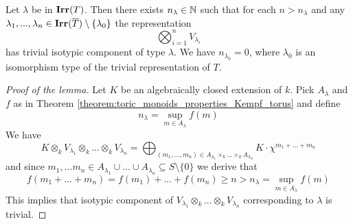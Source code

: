 \begin{lemma}\label{lemma:stablization_for_representations}
Let $\lambda$ be in $\mathbf{Irr}(T)$. Then there exists $n_{\lambda}\in {\mathbb N}$ such that for each $n > n_{\lambda}$ and any $\lambda_1,...,\lambda_n\in \mathbf{Irr}(\overline{T})\setminus \{\lambda_0\}$ the representation
$$\bigotimes_{i=1}^nV_{\lambda_i}$$ 
has trivial isotypic component of type $\lambda$. We have $n_{\lambda_0} = 0$, where $\lambda_0$ is an isomorphism type of the trivial representation of $T$.
\end{lemma}
\begin{proof}[Proof of the lemma]
Let $K$ be an algebraically closed extension of $k$. Pick $A_{\lambda}$ and $f$ as in Theorem \ref{theorem:toric_monoids_properties_Kempf_torus} and define
$$n_{\lambda} = \sup_{m\in A_{\lambda}}f(m)$$
We have
$$K\otimes_kV_{\lambda_1}\otimes_k...\otimes_kV_{\lambda_n} = \bigoplus_{(m_1,...,m_n)\in A_{\lambda_1}\times_k ...\times_k A_{\lambda_n}}K\cdot \chi^{m_1+...+m_n}$$
and since $m_1,...m_n\in A_{\lambda_1}\cup ...\cup A_{\lambda_n}\subseteq S\setminus \{0\}$ we derive that
$$f(m_1+...+m_n) = f(m_1) + ... + f(m_n) \geq n > n_{\lambda} = \sup_{m\in A_{\lambda}}f(m)$$
This implies that isotypic component of $V_{\lambda_1}\otimes_k...\otimes_kV_{\lambda_n}$ corresponding to $\lambda$ is trivial.
\end{proof}

